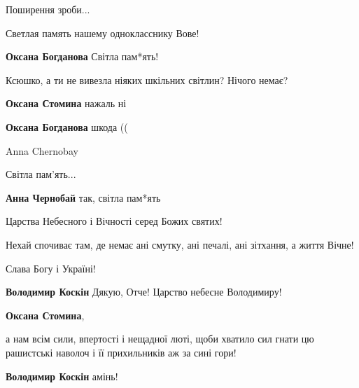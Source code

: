  
 
 
 
 

\qqSecCmt


Поширення зроби...


Светлая память нашему однокласснику Вове!🙏🏼🙏🏼🙏🏼

\begin{itemize} %
\textbf{Оксана Богданова} Світла пам*ять!


Ксюшко, а ти не вивезла ніяких шкільних світлин? Нічого немає?

\textbf{Оксана Стомина} нажаль ні

\textbf{Оксана Богданова} шкода ((

\end{itemize} %

Anna Chernobay

Світла пам'ять...

\begin{itemize} %
\textbf{Анна Чернобай} так, світла пам*ять
\end{itemize} %


Царства Небесного і Вічності серед Божих святих!

Нехай спочиває там, де немає ані смутку, ані печалі, ані зітхання, а життя Вічне!

Слава Богу і Україні!

\begin{itemize} %
\textbf{Володимир Коскін} Дякую, Отче! Царство небесне Володимиру!

\textbf{Оксана Стомина}, 

а нам всім сили, впертості і нещадної люті, щоби хватило сил гнати цю
рашистські наволоч і її прихильників аж за сині гори!

\textbf{Володимир Коскін} амінь!
\end{itemize} %

